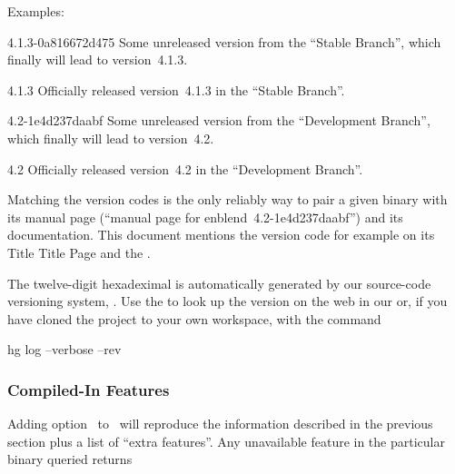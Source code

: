 \noindent Examples:

\begin{codelist}
\item[4.1.3-0a816672d475]\itemend
  Some unreleased version from the ``Stable Branch'', which finally will lead to version~4.1.3.

\item[4.1.3]\itemend
  Officially released version~4.1.3 in the ``Stable Branch''.

\item[4.2-1e4d237daabf]\itemend
  Some unreleased version from the ``Development Branch'', which finally will lead to
  version~4.2.

\item[4.2]\itemend
  Officially released version~4.2 in the ``Development Branch''.
\end{codelist}

Matching the version codes is the only reliably way to pair a given binary with its manual page
(``manual page for enblend~4.2-1e4d237daabf'') and its documentation.  This document mentions
the version code for example on its \ifhevea Title \else Title Page \fi and the
.

The twelve-digit hexadeximal  is automatically generated by our source-code
versioning system, .  Use the
 to look up the version on the web in our
%
%
%
 or, if you have cloned the project to
your own workspace, with the command
\begin{literal}
  hg log --verbose --rev 
\end{literal}


\subsubsection[Compiled-In Features]{\label{sec:compiled-in-features}%
  Compiled-In Features}

Adding option~ to~ will reproduce the information described
in the previous section plus a list of ``extra features''.  Any unavailable feature in the
particular binary queried returns

